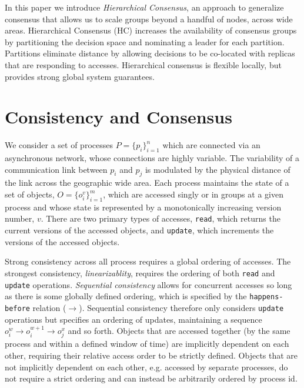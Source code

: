 \documentclass[11pt,letterpaper]{article}
\begin{document}

In this paper we introduce \emph{Hierarchical Consensus}, an approach to generalize
consensus that allows us to scale groups beyond a handful of nodes, across wide areas.
Hierarchical Consensus (HC) increases the availability of consensus groups by
partitioning the decision space and nominating a leader for each partition.
Partitions eliminate distance by allowing decisions to be co-located with replicas that
are responding to accesses. Hierarchical consensus is flexible locally, but provides
strong global system guarantees.

\section{Consistency and Consensus}

We consider a set of processes $P = \{p_i\}_{i=1}^n$ which are connected via an asynchronous network, whose connections are highly variable.
The variability of a communication link between $p_i$ and $p_j$ is modulated by the
physical distance of the link across the geographic wide area.
Each process maintains the state of a set of objects, $O = \{o_i^v\}_{i=1}^m$, which are
accessed singly or in groups at a given process and whose state is represented by a monotonically increasing version number, $v$. There are two primary types of accesses, \texttt{read}, which returns the current versions of the accessed objects, and \texttt{update}, which increments the versions of the accessed objects.

Strong consistency across all process requires a global ordering of accesses. The strongest consistency, \emph{linearizablity}, requires the ordering of both \texttt{read} and \texttt{update} operations. \emph{Sequential consistency} allows for concurrent accesses so long as there is some globally defined ordering, which is specified by the \texttt{happens-before} relation ($\rightarrow$). Sequential consistency therefore only considers \texttt{update} operations but specifies an ordering of updates, maintaining a sequence $o_i^w \rightarrow o_i^{w+1} \rightarrow o_j^x$ and so forth. Objects that are accessed together (by the same process and within a defined window of time) are implicitly dependent on each other, requiring their relative access order to be strictly defined. Objects that are not implicitly dependent on each other, e.g. accessed by separate processes, do not require a strict ordering and can instead be arbitrarily ordered by process id.
\end{document}
